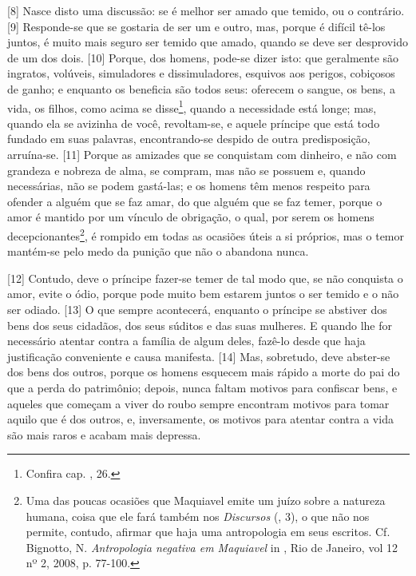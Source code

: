 {[}8{]} Nasce disto uma discussão: se é melhor ser amado que temido, ou
o contrário. {[}9{]} Responde-se que se gostaria de ser um e outro, mas,
porque é difícil tê-los juntos, é muito mais seguro ser temido que
amado, quando se deve ser desprovido de um dos dois. {[}10{]} Porque,
dos homens, pode-se dizer isto: que geralmente são ingratos, volúveis,
simuladores e dissimuladores, esquivos aos perigos, cobiçosos de ganho;
e enquanto os beneficia são todos seus: oferecem o sangue, os bens, a
vida, os filhos, como acima se disse\footnote{Confira cap. , 26.},
quando a necessidade está longe; mas, quando ela se avizinha de você,
revoltam-se, e aquele príncipe que está todo fundado em suas palavras,
encontrando-se despido de outra predisposição, arruína-se. {[}11{]}
Porque as amizades que se conquistam com dinheiro, e não com grandeza e
nobreza de alma, se compram, mas não se possuem e, quando necessárias,
não se podem gastá-las; e os homens têm menos respeito para ofender a
alguém que se faz amar, do que alguém que se faz temer, porque o amor é
mantido por um vínculo de obrigação, o qual, por serem os homens
decepcionantes\footnote{Uma das poucas ocasiões que Maquiavel emite um
  juízo sobre a natureza humana, coisa que ele fará também nos
  \emph{Discursos} (, 3), o que não nos permite, contudo, afirmar que
  haja uma antropologia em seus escritos. Cf. Bignotto, N.
  \emph{Antropologia negativa em Maquiavel} in , Rio de
  Janeiro, vol 12 nº 2, 2008, p. 77-100.}, é rompido em todas as
ocasiões úteis a si próprios, mas o temor mantém-se pelo medo da punição
que não o abandona nunca.

{[}12{]} Contudo, deve o príncipe fazer-se temer de tal modo que, se não
conquista o amor, evite o ódio, porque pode muito bem estarem juntos o
ser temido e o não ser odiado. {[}13{]} O que sempre acontecerá,
enquanto o príncipe se abstiver dos bens dos seus cidadãos, dos seus
súditos e das suas mulheres. E quando lhe for necessário atentar contra
a família de algum deles, fazê-lo desde que haja justificação
conveniente e causa manifesta. {[}14{]} Mas, sobretudo, deve abster-se
dos bens dos outros, porque os homens esquecem mais rápido a morte do
pai do que a perda do patrimônio; depois, nunca faltam motivos para
confiscar bens, e aqueles que começam a viver do roubo sempre encontram
motivos para tomar aquilo que é dos outros, e, inversamente, os motivos
para atentar contra a vida são mais raros e acabam mais depressa.

